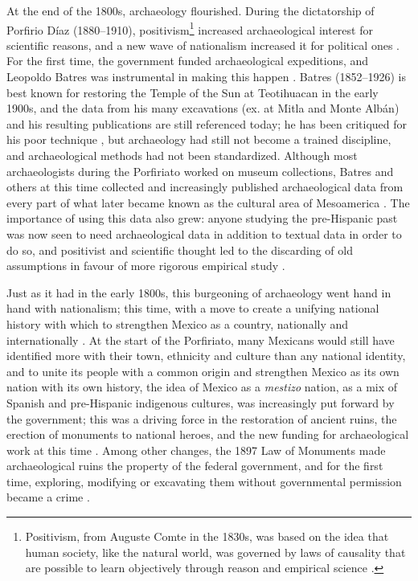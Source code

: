 At the end of the 1800s, archaeology flourished. During the dictatorship of Porfirio Díaz (1880–1910), positivism\footnote{Positivism, from Auguste Comte in the 1830s, was based on the idea that human society, like the natural world, was governed by laws of causality that are possible to learn objectively through reason and empirical science \parencite[13]{Howell2001}.} increased archaeological interest for scientific reasons, and a new wave of nationalism increased it for political ones \parencite[77]{Patterson1995}. 
For the first time, the government funded archaeological expeditions, and Leopoldo Batres was instrumental in making this happen \parencite[149,159]{Bernal1980}. 
Batres (1852–1926) is best known for restoring the Temple of the Sun at Teotihuacan in the early 1900s, and the data from his many excavations (ex. at Mitla and Monte Albán) and his resulting publications are still referenced today; he has been critiqued for his poor technique \parencites[149]{Bernal1980}[78]{Bueno2016}, 
but archaeology had still not become a trained discipline, and archaeological methods had not been standardized. Although most archaeologists during the Porfiriato worked on museum collections, Batres and others at this time collected and increasingly published archaeological data from every part of what later became known as the cultural area of Mesoamerica \parencites[159]{Bernal1980}[77]{Patterson1995}[63]{Swarthout2004}. 
The importance of using this data also grew: anyone studying the pre-Hispanic past was now seen to need archaeological data in addition to textual data in order to do so, and positivist and scientific thought led to the discarding of old assumptions in favour of more rigorous empirical study \parencites[159]{Bernal1980}[64]{Swarthout2004}.

Just as it had in the early 1800s, this burgeoning of archaeology went hand in hand with nationalism; this time, with a move to create a unifying national history with which to strengthen Mexico as a country, nationally and internationally \parencites[92]{Bueno2016}[63]{Swarthout2004}. 
At the start of the Porfiriato, many Mexicans would still have identified more with their town, ethnicity and culture than any national identity, and to unite its people with a common origin and strengthen Mexico as its own nation with its own history, the idea of Mexico as a \textit{mestizo} nation, as a mix of Spanish and pre-Hispanic indigenous cultures, was increasingly put forward by the government; this was a driving force in the restoration of ancient ruins, the erection of monuments to national heroes, and the new funding for archaeological work at this time \parencites[6,92]{Bueno2016}[63,66]{Swarthout2004}. 
Among other changes, the 1897 Law of Monuments made archaeological ruins the property of the federal government, and for the first time, exploring, modifying or excavating them without governmental permission became a crime \parencites[81]{Bueno2016}[180]{Lobjois2013}.

